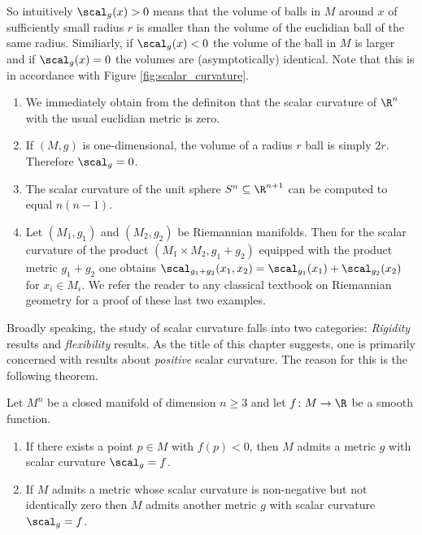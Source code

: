 So intuitively $\scal_g(x) > 0$ means that the volume of balls in $M$ around $x$ of sufficiently small radius $r$ is smaller than the volume of the euclidian ball of the same radius. Similiarly, if $\scal_g(x) < 0$ the volume of the ball in $M$ is larger and if $\scal_g(x) = 0$ the volumes are (asymptotically) identical. Note that this is in accordance with Figure \ref{fig:scalar_curvature}. 

\begin{example}
    \begin{enumerate}[label=(\roman*)]
        \label{psc:ex:scalar_curvature_examples}
        \item We immediately obtain from the definiton that the scalar curvature of $\R^n$ with the usual euclidian metric is zero.
        \item \label{psc:ex:scalar_curvature_examples2} If $(M,g)$ is one-dimensional, the volume of a radius $r$ ball is simply $2r$. Therefore $\scal_g = 0$.
        \item The scalar curvature of the unit sphere $S^n \subseteq \R^{n+1}$ can be computed to equal $n(n-1)$.
        \item \label{psc:ex:scalar_curvature_examples4} Let $(M_1,g_1)$ and $(M_2,g_2)$ be Riemannian manifolds. Then for the scalar curvature of the product $(M_1 \times M_2, g_1 + g_2)$ equipped with the product metric $g_1 + g_2$ one obtains $\scal_{g_1 + g_2}(x_1,x_2) = \scal_{g_1}(x_1) + \scal_{g_2}(x_2)$ for $x_i \in M_i$. We refer the reader to any classical textbook on Riemannian geometry for a proof of these last two examples.
    \end{enumerate}
\end{example}

Broadly speaking, the study of scalar curvature falls into two categories: \textit{Rigidity} results and \textit{flexibility} results. As the title of this chapter suggests, one is primarily concerned with results about \textit{positive} scalar curvature. The reason for this is the following theorem.

\begin{theorem}
    Let $M^n$ be a closed manifold of dimension $n \geq 3$ and let $f \colon M \to \R$ be a smooth function.
    \begin{enumerate}[label=(\roman*)]
        \item \label{psc:thm:kazdan_warner_part1} If there exists a point $p \in M$ with $f(p) < 0$, then $M$ admits a metric $g$ with scalar curvature $\scal_g = f$.
        \item \label{psc:thm:kazdan_warner_part2} If $M$ admits a metric whose scalar curvature is non-negative but not identically zero then $M$ admits another metric $g$ with scalar curvature $\scal_g = f$.
    \end{enumerate}
\end{theorem}


